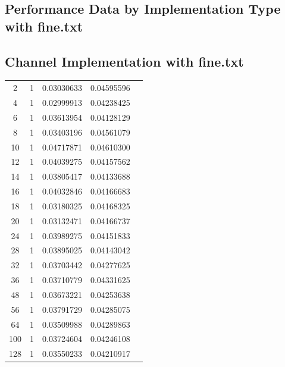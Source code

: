 \documentclass[letterpaper,12pt]{article}
\theoremstyle{remark}
\begin{document}
\clearpage


\subsection{Performance Data by Implementation Type with fine.txt}

\subsection*{Channel Implementation with fine.txt}
\begin{tabular}{ccccc}
2 & 1 & 0.03030633 & 0.04595596 \\
4 & 1 & 0.02999913 & 0.04238425 \\
6 & 1 & 0.03613954 & 0.04128129 \\
8 & 1 & 0.03403196 & 0.04561079 \\
10 & 1 & 0.04717871 & 0.04610300 \\
12 & 1 & 0.04039275 & 0.04157562 \\
14 & 1 & 0.03805417 & 0.04133688 \\
16 & 1 & 0.04032846 & 0.04166683 \\
18 & 1 & 0.03180325 & 0.04168325 \\
20 & 1 & 0.03132471 & 0.04166737 \\
24 & 1 & 0.03989275 & 0.04151833 \\
28 & 1 & 0.03895025 & 0.04143042 \\
32 & 1 & 0.03703442 & 0.04277625 \\
36 & 1 & 0.03710779 & 0.04331625 \\
48 & 1 & 0.03673221 & 0.04253638 \\
56 & 1 & 0.03791729 & 0.04285075 \\
64 & 1 & 0.03509988 & 0.04289863 \\
100 & 1 & 0.03724604 & 0.04246108 \\
128 & 1 & 0.03550233 & 0.04210917 \\
\end{tabular}
\end{document}
